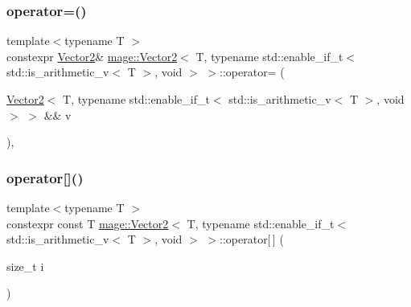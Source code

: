 \subsubsection{\texorpdfstring{operator=()}{operator=()}\hspace{0.1cm}{\footnotesize\ttfamily [2/2]}}
{\footnotesize\ttfamily template$<$typename T $>$ \\
constexpr \hyperlink{structmage_1_1_vector2}{Vector2}\& \hyperlink{structmage_1_1_vector2}{mage\+::\+Vector2}$<$ T, typename std\+::enable\+\_\+if\+\_\+t$<$ std\+::is\+\_\+arithmetic\+\_\+v$<$ T $>$, void $>$ $>$\+::operator= (\begin{DoxyParamCaption}\item[{\hyperlink{structmage_1_1_vector2}{Vector2}$<$ T, typename std\+::enable\+\_\+if\+\_\+t$<$ std\+::is\+\_\+arithmetic\+\_\+v$<$ T $>$, void $>$ $>$ \&\&}]{v }\end{DoxyParamCaption})\hspace{0.3cm}{\ttfamily [default]}, {\ttfamily [noexcept]}}

\hypertarget{structmage_1_1_vector2_3_01_t_00_01typename_01std_1_1enable__if__t_3_01std_1_1is__arithmetic__v_3_01_t_01_4_00_01void_01_4_01_4_ad4e66e44c59e34b4f76f099f7ebb7420}{}\label{structmage_1_1_vector2_3_01_t_00_01typename_01std_1_1enable__if__t_3_01std_1_1is__arithmetic__v_3_01_t_01_4_00_01void_01_4_01_4_ad4e66e44c59e34b4f76f099f7ebb7420} 
\subsubsection{\texorpdfstring{operator[]()}{operator[]()}\hspace{0.1cm}{\footnotesize\ttfamily [1/2]}}
{\footnotesize\ttfamily template$<$typename T $>$ \\
constexpr const T \hyperlink{structmage_1_1_vector2}{mage\+::\+Vector2}$<$ T, typename std\+::enable\+\_\+if\+\_\+t$<$ std\+::is\+\_\+arithmetic\+\_\+v$<$ T $>$, void $>$ $>$\+::operator\mbox{[}$\,$\mbox{]} (\begin{DoxyParamCaption}\item[{size\+\_\+t}]{i }\end{DoxyParamCaption})\hspace{0.3cm}{\ttfamily [noexcept]}}

